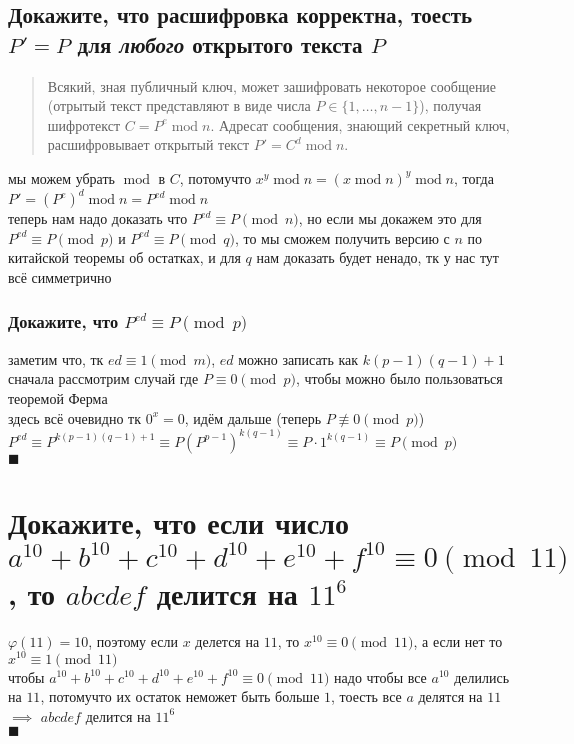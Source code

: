 \documentclass{article}
\newcommand{\Mod}[1]{\pmod{#1}}
\renewcommand{\mod}{\operatorname{mod}}
\begin{document}
  \subsection{Докажите, что расшифровка корректна, тоесть $P' = P$ для \textit{любого} открытого текста $P$}
  \begin{quote}
    Всякий, зная публичный ключ, может зашифровать некоторое сообщение (отрытый текст представляют в виде числа $P \in \{1,\dots,n-1\}$),
    получая шифротекст $C = P^e \mod n$. Адресат сообщения, знающий секретный ключ, расшифровывает открытый текст $P' = C^d \mod n$.
  \end{quote}
  мы можем убрать $\mod$ в $C$, потомучто $x^y \mod n = (x \mod n)^y \mod n$, тогда $P' = (P^e)^d \mod n = P^{ed} \mod n$ \\
  теперь нам надо доказать что $P^{ed} \equiv P \Mod{n}$, но если мы докажем это для $P^{ed} \equiv P \Mod{p}$ и $P^{ed} \equiv P \Mod{q}$,
  то мы сможем получить версию с $n$ по китайской теоремы об остатках, и для $q$ нам доказать будет ненадо, тк у нас тут всё симметрично
  \subsubsection{Докажите, что $P^{ed} \equiv P \Mod{p}$}
  заметим что, тк $ed \equiv 1 \Mod{m}$, $ed$ можно записать как $k(p-1)(q-1)+1$ \\
  сначала рассмотрим случай где $P \equiv 0 \Mod{p}$, чтобы можно было пользоваться теоремой Ферма \\
  здесь всё очевидно тк $0^x = 0$, идём дальше (теперь $P \not\equiv 0 \Mod{p}$) \\
  $ P^{ed} \equiv P^{k(p-1)(q-1)+1} \equiv P\left(P^{p-1}\right)^{k(q-1)} \equiv P \cdot 1^{k(q-1)} \equiv P \Mod{p} $ \\
  $\blacksquare$

  \section{Докажите, что если число $a^{10} + b^{10} + c^{10} + d^{10} + e^{10} + f^{10} \equiv 0 \Mod{11}$, то $abcdef$ делится на $11^6$}
  $\varphi(11) = 10$, поэтому если $x$ делется на $11$, то $x^{10} \equiv 0 \Mod{11}$, а если нет то $x^{10} \equiv 1 \Mod{11}$ \\
  чтобы $a^{10} + b^{10} + c^{10} + d^{10} + e^{10} + f^{10} \equiv 0 \Mod{11}$ надо чтобы все $a^{10}$ делились на $11$,
  потомучто их остаток неможет быть больше $1$, тоесть все $a$ делятся на $11$ $\implies$ $abcdef$ делится на $11^6$ \\
  $\blacksquare$
\end{document}
